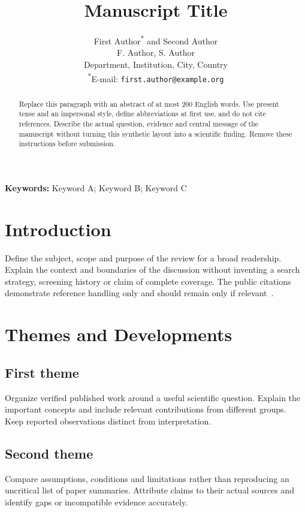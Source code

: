 \documentclass[a4paper,11pt]{article}
\title{Manuscript Title}
\author{First Author\textsuperscript{*} and Second Author\\
  \small F. Author, S. Author\\
  \small Department, Institution, City, Country\\
  \small \textsuperscript{*}E-mail: \texttt{first.author@example.org}}
\date{}
\begin{document}
\maketitle
\noindent\textbf{Keywords:} Keyword A; Keyword B; Keyword C

\begin{abstract}
Replace this paragraph with an abstract of at most 200 English words. Use
present tense and an impersonal style, define abbreviations at first use,
and do not cite references. Describe the actual question, evidence and
central message of the manuscript without turning this synthetic layout
into a scientific finding. Remove these instructions before submission.
\end{abstract}

\section{Introduction}\label{sec:introduction}
Define the subject, scope and purpose of the review for a broad readership.
Explain the context and boundaries of the discussion without inventing a
search strategy, screening history or claim of complete coverage. The
public citations demonstrate reference handling only and should remain
only if relevant~\cite{wilkinson2016fair,peng2011reproducible}.

\section{Themes and Developments}\label{sec:themes}
\subsection{First theme}
Organize verified published work around a useful scientific question.
Explain the important concepts and include relevant contributions from
different groups. Keep reported observations distinct from interpretation.

\subsection{Second theme}
Compare assumptions, conditions and limitations rather than reproducing
an uncritical list of paper summaries. Attribute claims to their actual
sources and identify gaps or incompatible evidence accurately.
\end{document}
